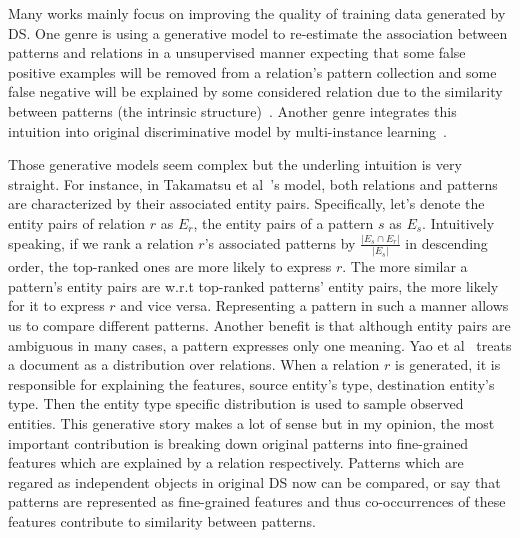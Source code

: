 \documentclass[10pt]{article} %
\theoremstyle{definition}
\theoremstyle{definition}
\begin{document}
Many works mainly focus on improving the quality of training data generated by DS. 
One genre is using a generative model to re-estimate the association between patterns and relations in a unsupervised manner expecting that some false positive examples will be removed from a relation's pattern collection and some false negative will be explained by some considered relation  
due to the similarity between patterns (the intrinsic structure)~\cite{takagenerative, yaolda, topicmodel}. 
Another genre integrates this intuition into original discriminative model by multi-instance learning~\cite{riedel, hoffmann, surdeanu, 4layers}. 



Those generative models seem complex but the underling intuition is very straight. 
For instance, in Takamatsu et al~\cite{takagenerative}'s model, both relations and patterns are characterized by their associated entity pairs. 
Specifically, let's denote the entity pairs of relation $r$ as $E_r$, the entity pairs of a pattern $s$ as $E_s$. 
Intuitively speaking, if we rank a relation $r$'s associated patterns by $\frac{\vert E_s \cap E_r \vert}{\vert E_s \vert}$ in descending order, the top-ranked ones are more likely to express $r$. 
The more similar a pattern's entity pairs are w.r.t top-ranked patterns' entity pairs, the more likely for it to express $r$ and vice versa. 
Representing a pattern in such a manner allows us to compare different patterns. 
Another benefit is that although entity pairs are ambiguous in many cases, a pattern expresses only one meaning. 
Yao et al~\cite{yaolda} treats a document as a distribution over relations. 
When a relation $r$ is generated, it is responsible for explaining the features, source entity's type, destination entity's type. 
Then the entity type specific distribution is used to sample observed entities. 
This generative story makes a lot of sense but in my opinion, the most important contribution is breaking down original patterns into fine-grained features which are explained by a relation respectively. 
Patterns which are regared as independent objects in original DS now can be compared, 
or say that patterns are represented as fine-grained features and thus co-occurrences of these features contribute to similarity between patterns. 
\end{document}

